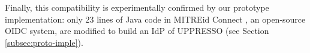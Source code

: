 Finally,
    this compatibility is experimentally confirmed by our prototype implementation:
     only 23 lines of Java code in MITREid Connect \cite{MITREid}, an open-source OIDC system,
 are modified
    to build an IdP of UPPRESSO (see Section \ref{subsec:proto-imple}).





